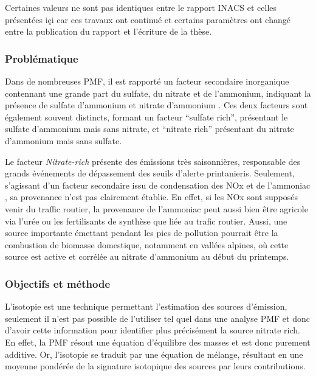 \begin{tcolorbox}[colback=red!5!white,colframe=ProcessBlue,title=Note]
    Certaines valeurs ne sont pas identiques entre le rapport INACS et celles présentées içi
    car ces travaux ont continué et certains paramètres ont changé entre la publication
    du rapport et l'écriture de la thèse.
\end{tcolorbox}


\subsubsection{Problématique}%
\label{ssub:problématique}

Dans de nombreuses PMF, il est rapporté un facteur secondaire inorganique contennant une
grande part du sulfate, du nitrate et de l'ammonium, indiquant la présence de sulfate
d'ammonium  et nitrate d'ammonium . Ces deux facteurs sont
également souvent distincts, formant un facteur ``sulfate rich'', présentant le sulfate
d'ammonium mais sans nitrate, et ``nitrate rich'' présentant du nitrate d'ammonium mais
sans sulfate.

Le facteur \textit{Nitrate-rich} présente des émissions très saisonnières, responsable des grands
événements de dépassement des seuils d'alerte printanieris. Seulement, s'agissant d'un
facteur secondaire issu de condensation des NOx et de l'ammoniac , sa provenance
n'est pas clairement établie. En effet, si les NOx sont supposés venir du traffic routier,
la provenance de l'ammoniac peut aussi bien être agricole via l'urée ou les fertilisants de
synthèse que liée au trafic routier. Aussi, une source importante émettant pendant les
pics de pollution pourrait être la combustion de biomasse domestique, notamment en vallées
alpines, où cette source est active et corrélée au nitrate d'ammonium au début du printemps.

\subsubsection{Objectifs et méthode}%
\label{ssub:objectif_et_methode}

L'isotopie est une technique permettant l'estimation des sources d'émission,
seulement il n'est pas possible de l'utiliser tel quel dans une analyse PMF et donc
d'avoir cette information pour identifier plus précisément la source nitrate rich.
En effet, la PMF résout une équation d'équilibre des masses et est donc purement
additive. Or, l'isotopie se traduit par une équation de mélange, résultant en une moyenne
pondérée de la signature isotopique des sources par leurs contributions.

